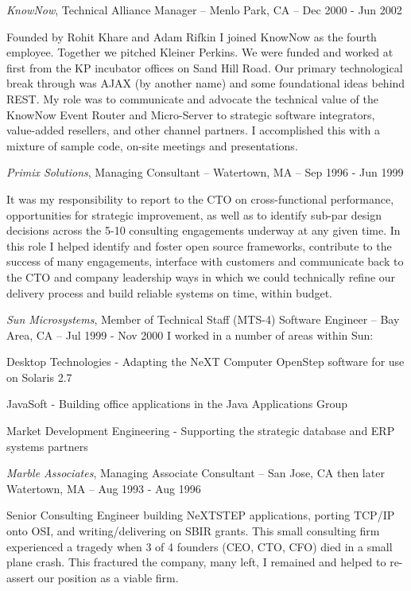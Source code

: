 \documentclass[letterpaper]{article}
\renewenvironment{itemize}{
  \begin{list}{}{
    \setlength{\leftmargin}{1.5em}
  }
}{
  \end{list}
}
\begin{document}
\begin{itemize}
\begin{itemize}
\item {\it KnowNow}, Technical Alliance Manager -- Menlo Park, CA -- Dec 2000 - Jun 2002

Founded by Rohit Khare and Adam Rifkin I joined KnowNow as the fourth
employee. Together we pitched Kleiner Perkins. We were funded and worked at
first from the KP incubator offices on Sand Hill Road. Our primary
technological break through was AJAX (by another name) and some foundational
ideas behind REST. My role was to communicate and advocate the technical value
of the KnowNow Event Router and Micro-Server to strategic software integrators,
value-added resellers, and other channel partners. I accomplished this with a
mixture of sample code, on-site meetings and presentations.

\item {\it Primix Solutions}, Managing Consultant -- Watertown, MA -- Sep 1996 - Jun 1999

It was my responsibility to report to the CTO on cross-functional performance,
opportunities for strategic improvement, as well as to identify sub-par design
decisions across the 5-10 consulting engagements underway at any given time. In
this role I helped identify and foster open source frameworks, contribute to
the success of many engagements, interface with customers and communicate back
to the CTO and company leadership ways in which we could technically refine our
delivery process and build reliable systems on time, within budget.

\item {\it Sun Microsystems}, Member of Technical Staff (MTS-4) Software Engineer -- Bay Area, CA -- Jul 1999 - Nov 2000
I worked in a number of areas within Sun:
\begin{itemize}
\item Desktop Technologies - Adapting the NeXT Computer OpenStep software for use on Solaris 2.7
\item JavaSoft - Building office applications in the Java Applications Group
\item Market Development Engineering - Supporting the strategic database and ERP systems partners
\end{itemize}

\item {\it Marble Associates}, Managing Associate Consultant -- San Jose, CA then later Watertown, MA -- Aug 1993 - Aug 1996

Senior Consulting Engineer building NeXTSTEP applications, porting TCP/IP onto
OSI, and writing/delivering on SBIR grants. This small consulting firm
experienced a tragedy when 3 of 4 founders (CEO, CTO, CFO) died in a small
plane crash. This fractured the company, many left, I remained and helped to
re-assert our position as a viable firm.


\end{itemize}
\end{itemize}
\end{document}
